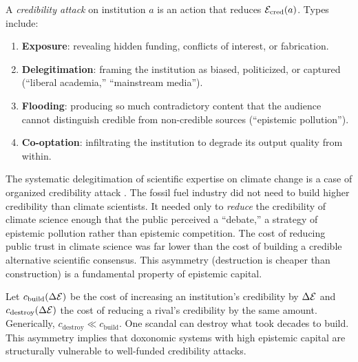 \begin{definition}
\label{def:credibility-attack}
A \emph{credibility attack} on institution $a$ is an action that reduces $\mathcal{E}_{\text{cred}}(a)$.
Types include:
\begin{enumerate}[nosep]
  \item \textbf{Exposure}: revealing hidden funding, conflicts of interest, or fabrication.
  \item \textbf{Delegitimation}: framing the institution as biased, politicized, or captured (``liberal academia,'' ``mainstream media'').
  \item \textbf{Flooding}: producing so much contradictory content that the audience cannot distinguish credible from non-credible sources (``epistemic pollution'').
  \item \textbf{Co-optation}: infiltrating the institution to degrade its output quality from within.
\end{enumerate}
\end{definition}

\begin{example}
\label{ex:war-expertise}
The systematic delegitimation of scientific expertise on climate change is a case of organized credibility attack \autocite{oreskes2010}.
The fossil fuel industry did not need to build higher credibility than climate scientists.
It needed only to \emph{reduce} the credibility of climate science enough that the public perceived a ``debate,'' a strategy of epistemic pollution rather than epistemic competition.
The cost of reducing public trust in climate science was far lower than the cost of building a credible alternative scientific consensus.
This asymmetry (destruction is cheaper than construction) is a fundamental property of epistemic capital.
\end{example}

\begin{proposition}
\label{prop:asymmetry}
Let $c_{\text{build}}(\Delta\mathcal{E})$ be the cost of increasing an institution's credibility by $\Delta\mathcal{E}$ and $c_{\text{destroy}}(\Delta\mathcal{E})$ the cost of reducing a rival's credibility by the same amount.
Generically, $c_{\text{destroy}} \ll c_{\text{build}}$.
One scandal can destroy what took decades to build.
This asymmetry implies that doxonomic systems with high epistemic capital are structurally vulnerable to well-funded credibility attacks.
\end{proposition}


